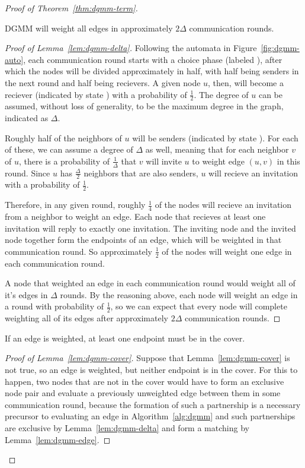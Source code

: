 \begin{proof}[Proof of Theorem~\ref{thm:dgmm-term}]
\begin{lem}
  \label{lem:dgmm-delta}
  DGMM will weight all edges in approximately $2\Delta$ communication rounds.
\end{lem}
\begin{proof}[Proof of Lemma~\ref{lem:dgmm-delta}]

Following the automata in Figure~\ref{fig:dgmm-auto}, each communication round starts with a choice phase (labeled \cCd), after which the nodes will be divided approximately in half, with half being senders in the next round and half being recievers. A given node $u$, then, will become a reciever (indicated by state \cLd) with a probability of $\frac{1}{2}$. The degree of $u$ can be assumed, without loss of generality, to be the maximum degree in the graph, indicated as $\Delta$. 

Roughly half of the neighbors of $u$ will be senders (indicated by state \cId). For each of these, we can assume a degree of $\Delta$ as well, meaning that for each neighbor $v$ of $u$, there is a probability of $\frac{1}{\Delta}$ that $v$ will invite $u$ to weight edge $(u,v)$ in this round. Since $u$ has $\frac{\Delta}{2}$ neighbors that are also senders, $u$ will recieve an invitation with a probability of $\frac{1}{2}$. 

Therefore, in any given round, roughly $\frac{1}{4}$ of the nodes will recieve an invitation from a neighbor to weight an edge. Each node that recieves at least one invitation will reply to exactly one invitation. The inviting node and the invited node together form the endpoints of an edge, which will be weighted in that communication round. So approximately $\frac{1}{2}$ of the nodes will weight one edge in each communication round.

A node that weighted an edge in each communication round would weight all of it's edges in $\Delta$ rounds. By the reasoning above, each node will weight an edge in a round with probability of $\frac{1}{2}$, so we can expect that every node will complete weighting all of its edges after approximately $2\Delta$ communication rounds.

\end{proof}
\begin{lem}
  \label{lem:dgmm-cover}
  If an edge is weighted, at least one endpoint must be in the cover.
\end{lem}
\begin{proof}[Proof of Lemma~\ref{lem:dgmm-cover}]

  Suppose that Lemma~\ref{lem:dgmm-cover} is not true, so an edge is weighted, but neither endpoint is in the cover. For this to happen, two nodes that are not in the cover would have to form an exclusive node pair and evaluate a previously unweighted edge between them in some communication round, because the formation of such a partnership is a necessary precursor to evaluating an edge in Algorithm~\ref{alg:dgmm} and such partnerships are exclusive by Lemma~\ref{lem:dgmm-delta} and form a matching by Lemma~\ref{lem:dgmm-edge}. 


\end{proof}
\end{proof}
